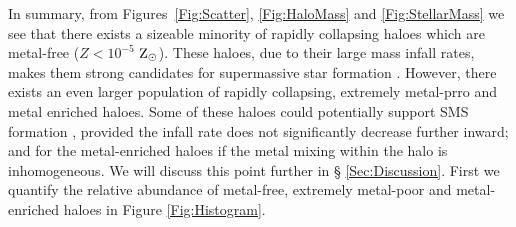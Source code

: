 \documentclass[graphics, twocolumn, usenatbib]{mn2e}
\newcommand{\zsolarc} {$\rm{Z_{\odot}}$}
\begin{document}
In summary, from Figures~\ref{Fig:Scatter}, \ref{Fig:HaloMass}
and \ref{Fig:StellarMass} we see that there exists a sizeable minority of rapidly collapsing haloes
which are metal-free ($Z < 10^{-5}$ \zsolarc). These
haloes, due to their large mass infall rates, makes them strong candidates for supermassive
star formation \citep{Woods_2018, Chon_2020}. However,  there exists an even larger population of
rapidly collapsing, extremely metal-prro and metal enriched haloes. Some of these haloes could
potentially support SMS formation \citep[see e.g.][]{Chon_2020},
provided the infall rate does not significantly decrease further inward; 
and for the metal-enriched haloes if the metal mixing within the halo is inhomogeneous. We will discuss this point further in \S
\ref{Sec:Discussion}. First we quantify the relative abundance of metal-free, extremely metal-poor
and metal-enriched haloes in Figure \ref{Fig:Histogram}.
\end{document}
